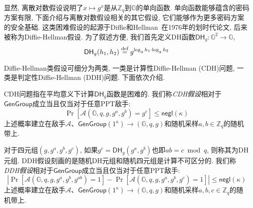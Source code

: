 显然, 离散对数假设说明了$x \mapsto g^x$是从$\mathbb{Z}_q$到$\mathbb{G}$的单向函数. 
单向函数能够蕴含的密码方案有限, 下面介绍与离散对数假设相关的其它假设, 它们能够作为更多密码方案的安全基础. 
这类困难假设的起源于Diffie和Hellman~\cite{DH-IEEE-IT-1976}在1976年的划时代论文, 
后来被称为Diffie-Hellman假设. 
为了叙述方便, 我们首先定义DH函数$\mathsf{DH}_g: \mathbb{G}^2 \rightarrow \mathbb{G}$, 
\begin{equation*}
\mathsf{DH}_g(h_1, h_2) \stackrel{\textup{def}}{=} g^{\log_g h_1 \cdot \log_g h_2}
\end{equation*} 




Diffie-Hellman类假设可细分为两类, 一类是计算性Diffie-Hellman (CDH)问题, 一类是判定性Diffie-Hellman (DDH)问题. 
下面依次介绍.

\begin{definition}[CDH假设]
CDH问题指在平均意义下计算$\mathsf{DH}_g$函数是困难的. 
我们称\emph{CDH假设}相对于$\mathsf{GenGroup}$成立当且仅当对于任意PPT敌手: 
\begin{equation*}
\Pr[\mathcal{A}(\mathbb{G}, q, g, g^a, g^b) = g^c] \leq \mathsf{negl}(\kappa)
\end{equation*} 	
上述概率建立在敌手$\mathcal{A}$、$\mathsf{GenGroup}(1^\kappa) \rightarrow (\mathbb{G}, q, g)$和随机采样$a, b \in \mathbb{Z}_q$的随机带上. 
\end{definition}  

\begin{definition}[DDH假设]
对于四元组$(g, g^a, g^b, g^c)$, 如果$g^c = \mathsf{DH}_g(g^a, g^b)$也即$ab = c \bmod q$, 则称其为DH元组. 
DDH假设刻画的是随机DH元组和随机四元组是计算不可区分的. 我们称\emph{DDH假设}相对于$\mathsf{GenGroup}$成立当且仅当对于任意PPT敌手: 
\begin{equation*}
|\Pr[\mathcal{A}(\mathbb{G}, q, g, g^a, g^b, g^{ab})=1] - \Pr[\mathcal{A}(\mathbb{G}, q, g, g^a, g^b, g^c)=1]| 
\leq \mathsf{negl}(\kappa)
\end{equation*}  
上述概率建立在敌手$\mathcal{A}$、$\mathsf{GenGroup}(1^\kappa) \rightarrow (\mathbb{G}, q, g)$和随机采样$a, b, c \in \mathbb{Z}_q$的随机带上. 
\end{definition} 


